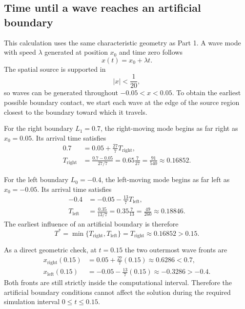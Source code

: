 \subsection{Time until a wave reaches an artificial boundary}

This calculation uses the same characteristic geometry as Part 1. A wave mode
with speed $\lambda$ generated at position $x_0$ and time zero follows
\begin{equation}
 x(t)=x_0+\lambda t.
 \label{eq:part2-characteristic-path}
\end{equation}
The spatial source is supported in
\[
 |x|<\frac{1}{20},
\]
so waves can be generated throughout $-0.05<x<0.05$. To obtain the earliest
possible boundary contact, we start each wave at the edge of the source region
closest to the boundary toward which it travels.

For the right boundary $L_1=0.7$, the right-moving mode begins as far right as
$x_0=0.05$. Its arrival time satisfies
\begin{align}
 0.7&=0.05+\frac{27}{7}T_{\mathrm{right}},\\
 T_{\mathrm{right}}
 &=\frac{0.7-0.05}{27/7}
 =0.65\frac{7}{27}
 =\frac{91}{540}
 \approx0.16852.
\end{align}

For the left boundary $L_0=-0.4$, the left-moving mode begins as far left as
$x_0=-0.05$. Its arrival time satisfies
\begin{align}
 -0.4&=-0.05-\frac{13}{7}T_{\mathrm{left}},\\
 T_{\mathrm{left}}
 &=\frac{0.35}{13/7}
 =0.35\frac{7}{13}
 =\frac{49}{260}
 \approx0.18846.
\end{align}
The earliest influence of an artificial boundary is therefore
\begin{equation}
 \boxed{
 T^*=\min\{T_{\mathrm{right}},T_{\mathrm{left}}\}
 =T_{\mathrm{right}}
 \approx0.16852>0.15.}
 \label{eq:part2-boundary-time}
\end{equation}

As a direct geometric check, at $t=0.15$ the two outermost wave fronts are
\begin{align}
 x_{\mathrm{right}}(0.15)
 &=0.05+\frac{27}{7}(0.15)
 \approx0.6286<0.7,\\
 x_{\mathrm{left}}(0.15)
 &=-0.05-\frac{13}{7}(0.15)
 \approx-0.3286>-0.4.
\end{align}
Both fronts are still strictly inside the computational interval. Therefore
the artificial boundary conditions cannot affect the solution during the
required simulation interval $0\leq t\leq0.15$.

